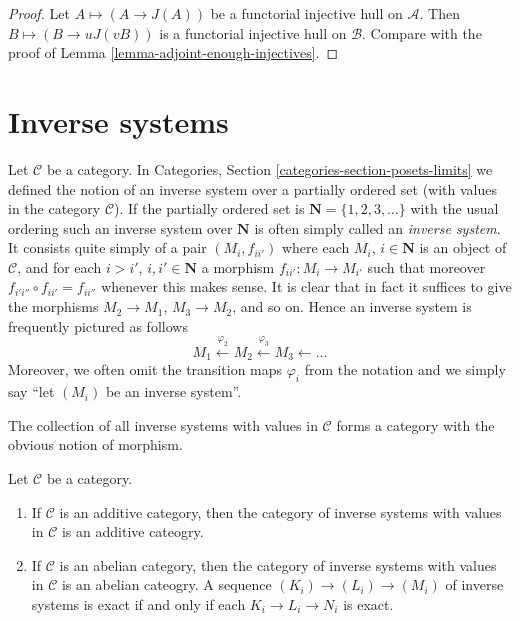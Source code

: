 \begin{proof}
Let $A \mapsto (A \to J(A))$ be a functorial
injective hull on $\mathcal{A}$. Then
$B \mapsto (B \to uJ(vB))$ is a functorial
injective hull on $\mathcal{B}$. Compare with the
proof of Lemma \ref{lemma-adjoint-enough-injectives}.
\end{proof}











\section{Inverse systems}
\label{section-inverse-systems}

\noindent
Let $\mathcal{C}$ be a category.
In Categories, Section \ref{categories-section-posets-limits}
we defined the notion of an inverse system over a partially ordered set
(with values in the category $\mathcal{C}$).
If the partially ordered set is $\mathbf{N} = \{1, 2, 3, \ldots\}$
with the usual ordering such an inverse system over $\mathbf{N}$
is often simply called an {\it inverse system}. It consists quite simply
of a pair $(M_i, f_{ii'})$ where each $M_i$, $i \in \mathbf{N}$
is an object of $\mathcal{C}$, and for each $i > i'$, $i, i' \in \mathbf{N}$
a morphism $f_{ii'} : M_i \to M_{i'}$ such that moreover
$f_{i'i''} \circ f_{ii'} = f_{ii''}$ whenever this makes sense.
It is clear that in fact it suffices to give the morphisms
$M_2 \to M_1$, $M_3 \to M_2$, and so on. Hence an inverse system
is frequently pictured as follows
$$
M_1 \xleftarrow{\varphi_2} M_2 \xleftarrow{\varphi_3} M_3 \leftarrow \ldots
$$
Moreover, we often omit the transition maps $\varphi_i$ from the notation
and we simply say ``let $(M_i)$ be an inverse system''.

\medskip\noindent
The collection of all inverse systems with values in
$\mathcal{C}$ forms a category with the obvious notion of morphism.

\begin{lemma}
\label{lemma-inverse-systems-abelian}
Let $\mathcal{C}$ be a category.
\begin{enumerate}
\item If $\mathcal{C}$ is an additive category, then the category
of inverse systems with values in $\mathcal{C}$ is an additive cateogry.
\item If $\mathcal{C}$ is an abelian category, then the category
of inverse systems with values in $\mathcal{C}$ is an abelian cateogry.
A sequence $(K_i) \to (L_i) \to (M_i)$ of inverse systems
is exact if and only if each $K_i \to L_i \to N_i$ is exact.
\end{enumerate}
\end{lemma}

